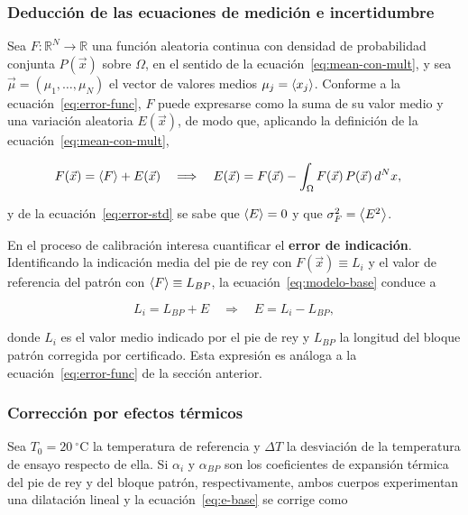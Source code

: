 \subsubsection{Deducción de las ecuaciones de medición e incertidumbre}

Sea $F: \mathbb{R}^N \to \mathbb{R}$ una función aleatoria continua con densidad de
probabilidad conjunta $P(\vec{x})$ sobre $\Omega$, en el sentido de la
ecuación~\eqref{eq:mean-con-mult}, y sea $\vec{\mu} = (\mu_1, \dots, \mu_N)$ el
vector de valores medios $\mu_j = \left\langle x_j \right\rangle$. Conforme a la
ecuación~\eqref{eq:error-func}, $F$ puede expresarse como la suma de su valor medio
y una variación aleatoria $E(\vec{x})$, de modo que, aplicando la definición de la
ecuación~\eqref{eq:mean-con-mult},

\begin{align}
  F(\vec{x}) &= \left\langle F \right\rangle + E(\vec{x})
  \quad\Longrightarrow\quad
  E(\vec{x}) = F(\vec{x}) - \int_\Omega F(\vec{x})\,P(\vec{x})\,d^Nx ,
  \label{eq:modelo-base}
\end{align}

y de la ecuación~\eqref{eq:error-std} se sabe que $\left\langle E \right\rangle = 0$ y que
$\sigma_F^2 = \left\langle E^2 \right\rangle$.

En el proceso de calibración interesa cuantificar el \textbf{error de indicación}.
Identificando la indicación media del pie de rey con $F(\vec{x}) \equiv L_i$ y el
valor de referencia del patrón con $\left\langle F \right\rangle \equiv L_{BP}$, la
ecuación~\eqref{eq:modelo-base} conduce a

\begin{equation}
  L_i = L_{BP} + E \quad\Longrightarrow\quad E = L_i - L_{BP},
  \label{eq:e-base}
\end{equation}

donde $L_i$ es el valor medio indicado por el pie de rey y $L_{BP}$ la longitud del
bloque patrón corregida por certificado. Esta expresión es análoga a la
ecuación~\eqref{eq:error-func} de la sección anterior.

\subsubsection*{Corrección por efectos térmicos}

Sea $T_0 = 20\ ^\circ\text{C}$ la temperatura de referencia y $\Delta T$ la
desviación de la temperatura de ensayo respecto de ella. Si $\alpha_i$ y
$\alpha_{BP}$ son los coeficientes de expansión térmica del pie de rey y del bloque
patrón, respectivamente, ambos cuerpos experimentan una dilatación lineal y la
ecuación~\eqref{eq:e-base} se corrige como

